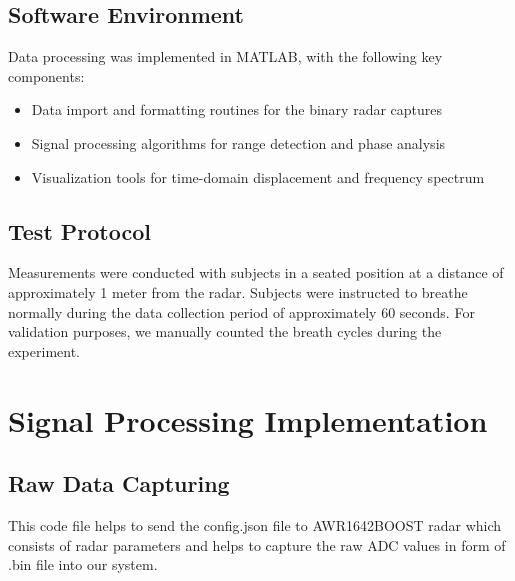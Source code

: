 \documentclass[12pt]{article}
\begin{document}
\subsection{Software Environment}
Data processing was implemented in MATLAB, with the following key components:
\begin{itemize}
    \item Data import and formatting routines for the binary radar captures
    \item Signal processing algorithms for range detection and phase analysis
    \item Visualization tools for time-domain displacement and frequency spectrum
\end{itemize}

\subsection{Test Protocol}
Measurements were conducted with subjects in a seated position at a distance of approximately 1 meter from the radar. Subjects were instructed to breathe normally during the data collection period of approximately 60 seconds. For validation purposes, we manually counted the breath cycles during the experiment.

\section{Signal Processing Implementation}

\subsection{Raw Data Capturing}
This code file helps to send the config.json file to AWR1642BOOST radar which consists of radar parameters and helps to capture the raw ADC values in form of .bin file into our system.
\end{document}
